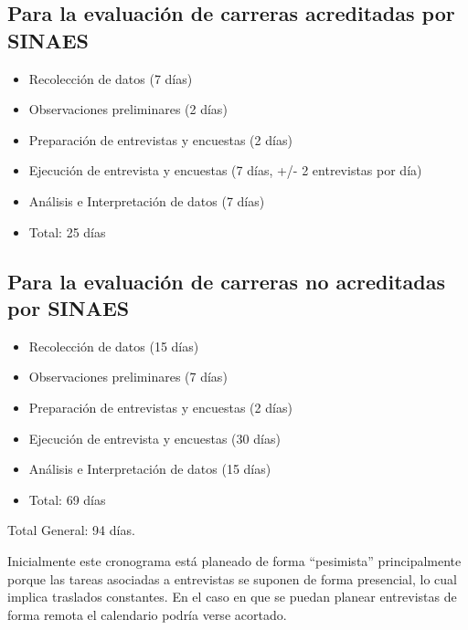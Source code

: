 \subsection{Para la evaluación de carreras acreditadas por SINAES}
\begin{itemize}
    \item Recolección de datos (7 días)
    \item Observaciones preliminares (2 días) 
    \item Preparación de entrevistas y encuestas (2 días)
    \item Ejecución de entrevista y encuestas (7 días, +/- 2 entrevistas por día)
    \item Análisis e Interpretación de datos (7 días)
    \item Total: 25 días
\end{itemize}

\subsection{Para la evaluación de carreras no acreditadas por SINAES}
\begin{itemize}
    \item Recolección de datos (15 días)
    \item Observaciones preliminares (7 días) 
    \item Preparación de entrevistas y encuestas (2 días)
    \item Ejecución de entrevista y encuestas (30 días)
    \item Análisis e Interpretación de datos (15 días)
    \item Total: 69 días
\end{itemize}

Total General: 94 días. 

Inicialmente este cronograma está planeado de forma ``pesimista'' principalmente porque las tareas asociadas a entrevistas se suponen de forma presencial, lo cual implica traslados constantes. En el caso en que se puedan planear entrevistas de forma remota el calendario podría verse acortado.